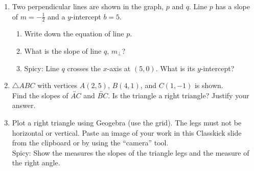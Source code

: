 \begin{enumerate}
\newpage
\item Two perpendicular lines are shown in the graph, $p$ and $q$. Line $p$ has a slope of $\displaystyle m = -\frac{1}{2}$ and a $y$-intercept $b=5$.
\begin{multicols}{2}
    \begin{enumerate}[itemsep=1cm]
      \item Write down the equation of line $p$.
      \item What is the slope of line $q$, $m_\perp$?
      \item Spicy: Line $q$ crosses the $x$-axis at $(5,0)$. What is its $y$-intercept?
      \end{enumerate}
    \begin{flushright}
    \end{flushright}
\end{multicols}

\item $\triangle ABC$ with vertices $A(2,5)$, $B(4,1)$, and $C(1,-1)$ is shown. \\[0.5cm]
Find the slopes of $\overleftrightarrow{AC}$ and $\overleftrightarrow{BC}$. Is the triangle a right triangle? Justify your answer.
  \begin{flushright}
    \end{flushright}

\item Plot a right triangle using Geogebra (use the grid). The legs must not be horizontal or vertical. Paste an image of your work in this Classkick slide from the clipboard or by using the ``camera'' tool.\\[0.25cm]
Spicy: Show the measures the slopes of the triangle legs and the measure of the right angle.


\end{enumerate}
